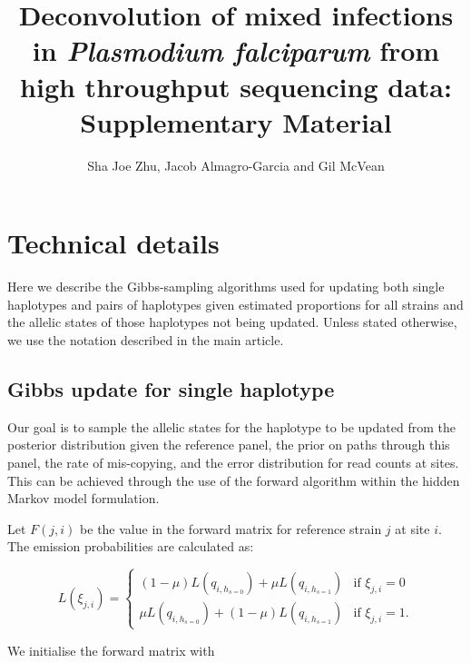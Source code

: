 \documentclass{article}
\title{Deconvolution of mixed infections in {\it Plasmodium falciparum} from high throughput sequencing data: Supplementary Material}
\author{Sha Joe Zhu, Jacob Almagro-Garcia and Gil McVean}
\date{}
\begin{document}
\listoftodos
\clearpage
\setcounter{page}{1}

\maketitle

\setcounter{section}{0}




\section{Technical details} \label{sup:sec:alg}

Here we describe the Gibbs-sampling algorithms used for updating both single haplotypes and pairs of haplotypes given estimated proportions for all strains and the allelic states of those haplotypes not being updated.  Unless stated otherwise, we use the notation described in the main article.



\subsection{Gibbs update for single haplotype}

Our goal is to sample the allelic states for the haplotype to be updated from the posterior distribution given the reference panel, the prior on paths through this panel, the rate of mis-copying, and the error distribution for read counts at sites.  This can be achieved through the use of the forward algorithm within the hidden Markov model formulation.

Let $F(j,i)$ be the value in the forward matrix for reference strain $j$ at site $i$.  The emission probabilities are calculated as:

\begin{equation}
L(\xi_{j,i}) =
\begin{cases}
(1-\mu) L(q_{i,h_{s=0}})+\mu L(q_{i,h_{s=1}}) & \text{if $\xi_{j,i}=0$}\\
\mu L(q_{i,h_{s=0}})+(1-\mu) L(q_{i,h_{s=1}}) & \text{if $\xi_{j,i}=1$}.
\end{cases}
\label{eqn:emiss_1hap}
\end{equation}

\noindent We initialise the forward matrix with
\end{document}
